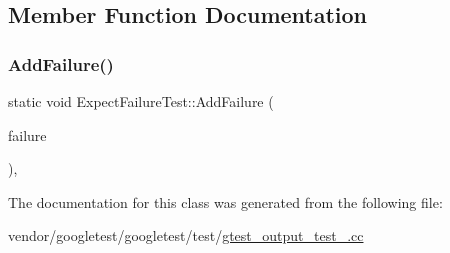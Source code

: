 \subsection{Member Function Documentation}
\mbox{\label{class_expect_failure_test_ab9aeb7820ff7953fc2975ecc5abd046b}} 
\subsubsection{\texorpdfstring{Add\+Failure()}{AddFailure()}}
{\footnotesize\ttfamily static void Expect\+Failure\+Test\+::\+Add\+Failure (\begin{DoxyParamCaption}\item[{\hyperlink{class_expect_failure_test_aad05da10bb15d21a434eba3b37011406}{Failure\+Mode}}]{failure }\end{DoxyParamCaption})\hspace{0.3cm}{\ttfamily [inline]}, {\ttfamily [static]}}



The documentation for this class was generated from the following file\+:\begin{DoxyCompactItemize}
\item 
vendor/googletest/googletest/test/\hyperlink{gtest__output__test___8cc}{gtest\+\_\+output\+\_\+test\+\_\+.\+cc}\end{DoxyCompactItemize}
